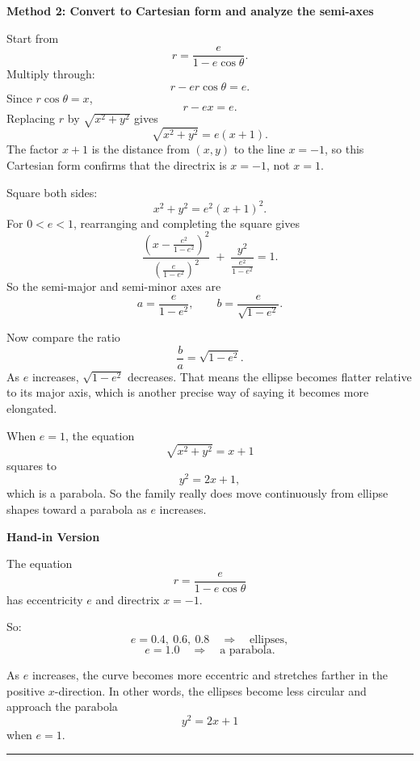 \documentclass[a4paper,12pt,twocolumn]{article}
\newenvironment{solutionbox}{\begin{framed}}{\end{framed}}
\newcommand{\sectiontitle}[2]{%
  \hypertarget{#1}{}%
  \par\vspace{0.8em}%
  \noindent{\Large\bfseries #2}\par
  \vspace{0.3em}%
  \hrule
  \vspace{0.8em}%
}
\begin{document}
\begin{solutionbox}
\textbf{Method 2: Convert to Cartesian form and analyze the semi-axes}

\begin{steps}
\item Start from
\[
r=\frac{e}{1-e\cos\theta}.
\]
Multiply through:
\[
r-er\cos\theta=e.
\]
Since \(r\cos\theta=x\),
\[
r-ex=e.
\]
Replacing \(r\) by \(\sqrt{x^2+y^2}\) gives
\[
\sqrt{x^2+y^2}=e(x+1).
\]
The factor \(x+1\) is the distance from \((x,y)\) to the line \(x=-1\), so this Cartesian form confirms that the directrix is \(x=-1\), not \(x=1\).

\item Square both sides:
\[
x^2+y^2=e^2(x+1)^2.
\]
For \(0<e<1\), rearranging and completing the square gives
\[
\frac{\left(x-\frac{e^2}{1-e^2}\right)^2}{\left(\frac{e}{1-e^2}\right)^2}
\;+\;
\frac{y^2}{\frac{e^2}{1-e^2}}
=1.
\]
So the semi-major and semi-minor axes are
\[
a=\frac{e}{1-e^2},
\qquad
b=\frac{e}{\sqrt{1-e^2}}.
\]

\item Now compare the ratio
\[
\frac{b}{a}=\sqrt{1-e^2}.
\]
As \(e\) increases, \(\sqrt{1-e^2}\) decreases. That means the ellipse becomes flatter relative to its major axis, which is another precise way of saying it becomes more elongated.

\item When \(e=1\), the equation
\[
\sqrt{x^2+y^2}=x+1
\]
squares to
\[
y^2=2x+1,
\]
which is a parabola. So the family really does move continuously from ellipse shapes toward a parabola as \(e\) increases.
\end{steps}
\end{solutionbox}

\begin{solutionbox}
\textbf{Hand-in Version}

The equation
\[
r=\frac{e}{1-e\cos\theta}
\]
has eccentricity \(e\) and directrix \(x=-1\).

So:
\[
e=0.4,\ 0.6,\ 0.8 \quad\Rightarrow\quad \text{ellipses},
\]
\[
e=1.0 \quad\Rightarrow\quad \text{a parabola}.
\]

As \(e\) increases, the curve becomes more eccentric and stretches farther in the positive \(x\)-direction. In other words, the ellipses become less circular and approach the parabola
\[
\boxed{y^2=2x+1}
\]
when \(e=1\).
\end{solutionbox}

\sectiontitle{sec:10-review}{10 Review}
\end{document}
